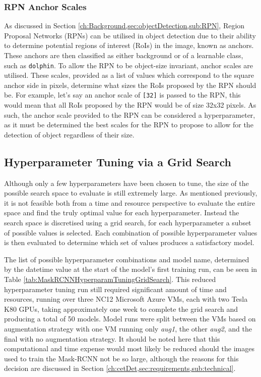 \subsubsection{RPN Anchor Scales}\label{ch:cetDet,sec:ModelSelection,sub:TrainingHyperparameters,subsub:RPNAnchorScales}

As discussed in Section \ref{ch:Background,sec:objectDetection,sub:RPN}, Region Proposal Networks (RPNs) can be utilised in object detection due to their ability to determine potential regions of interest (RoIs) in the image, known as anchors. These anchors are then classified as either background or of a learnable class, such as \texttt{dolphin}. To allow the RPN to be object-size invariant, anchor scales are utilised. These scales, provided as a list of values which correspond to the square anchor side in pixels, determine what sizes the RoIs proposed by the RPN should be. For example, let's say an anchor scale of \texttt{[32]} is passed to the RPN, this would mean that all RoIs proposed by the RPN would be of size 32x32 pixels. As such, the anchor scale provided to the RPN can be considered a hyperparameter, as it must be determined the best scales for the RPN to propose to allow for the detection of object regardless of their size. 

\subsection{Hyperparameter Tuning via a Grid Search}\label{ch:cetDet,sec:ModelSelection,sub:HyperparameterTuning}

Although only a few hyperparameters have been chosen to tune, the size of the possible search space to evaluate is still extremely large. As mentioned previously, it is not feasible both from a time and resource perspective to evaluate the entire space and find the truly optimal value for each hyperparameter. Instead the search space is discretised using a grid search, for each hyperparameter a subset of possible values is selected. Each combination of possible hyperparameter values is then evaluated to determine which set of values produces a satisfactory model. 

The list of possible hyperparameter combinations and model name, determined by the datetime value at the start of the model's first training run, can be seen in Table \ref{tab:MaskRCNNHyperparamTuningGridSearch}. This reduced hyperparameter tuning run still required significant amount of time and resources, running over three NC12 Microsoft Azure VMs, each with two Tesla K80 GPUs, taking approximately one week to complete the grid search and producing a total of 50 models. Model runs were split between the VMs based on augmentation strategy with one VM running only \textit{aug1}, the other \textit{aug2}, and the final with no augmentation strategy. It should be noted here that this computational and time expense would most likely be reduced should the images used to train the Mask-RCNN not be so large, although the reasons for this decision are discussed in Section \ref{ch:cetDet,sec:requirements,sub:technical}.

